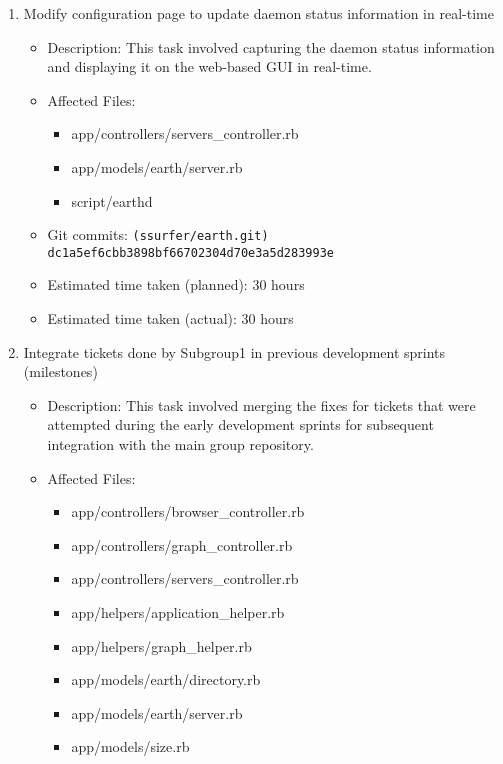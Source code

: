 \documentclass{article}
\begin{document}
\begin{enumerate}
    \item Modify configuration page to update daemon status information in real-time
        \begin{itemize}
            \item Description: This task involved capturing the daemon status information and displaying it on the web-based GUI in real-time.
            \item Affected Files:
                \begin{itemize}
                    \item app/controllers/servers\_controller.rb
                    \item app/models/earth/server.rb
                    \item script/earthd
                \end{itemize}
            \item Git commits: \texttt{(ssurfer/earth.git) dc1a5ef6cbb3898bf66702304d70e3a5d283993e}
            \item Estimated time taken (planned): 30 hours
            \item Estimated time taken (actual): 30 hours
        \end{itemize}
    \item Integrate tickets done by Subgroup1 in previous development sprints (milestones)
        \begin{itemize}
            \item Description: This task involved merging the fixes for tickets that were attempted during the early development sprints for subsequent integration with the main group repository.
            \item Affected Files:
                \begin{itemize}
                    \item app/controllers/browser\_controller.rb
                    \item app/controllers/graph\_controller.rb
                    \item app/controllers/servers\_controller.rb
                    \item app/helpers/application\_helper.rb
                    \item app/helpers/graph\_helper.rb
                    \item app/models/earth/directory.rb
                    \item app/models/earth/server.rb
                    \item app/models/size.rb

\end{itemize}
\end{itemize}
\end{enumerate}
\end{document}
